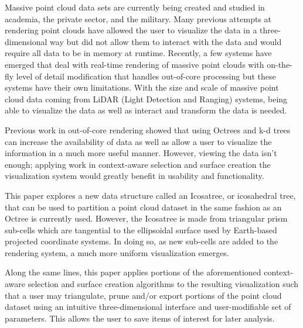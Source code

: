 \begin{abstractpage}
Massive point cloud data sets are currently being created and studied in
academia, the private sector, and the military. Many previous attempts at
rendering point clouds have allowed the user to visualize the data in a
three-dimensional way but did not allow them to interact with the data and would
require all data to be in memory at runtime. Recently, a few systems have
emerged that deal with real-time rendering of massive point clouds with
on-the-fly level of detail modification that handles out-of-core processing but
these systems have their own limitations. With the size and scale of massive
point cloud data coming from LiDAR (Light Detection and Ranging) systems, being
able to visualize the data as well as interact and transform the data is needed.

Previous work in out-of-core rendering
\cite{3_wenzel2014out,4_goswami_zhang_pajarola_gobbetti_2010,5_richter_2010}
showed that using Octrees and k-d trees can increase the availability of data as
well as allow a user to visualize the information in a much more useful manner.
However, viewing the data isn't enough; applying work in context-aware selection
\cite{2_yu:hal-01178051} and surface creation \cite{1_VAST:VAST11:105-112} the
visualization system would greatly benefit in usability and functionality.

This paper explores a new data structure called an Icosatree, or icosahedral
tree, that can be used to partition a point cloud dataset in the same fashion as
an Octree is currently used. However, the Icosatree is made from triangular
prism sub-cells which are tangential to the ellipsoidal surface used by
Earth-based projected coordinate systems. In doing so, as new sub-cells are
added to the rendering system, a much more uniform visualization emerges. 

Along the same lines, this paper applies portions of the aforementioned
context-aware selection and surface creation algorithms to the resulting
visualization such that a user may triangulate, prune and/or export portions of
the point cloud dataset using an intuitive three-dimensional interface and
user-modifiable set of parameters. This allows the user to save items of
interest for later analysis.
\end{abstractpage}